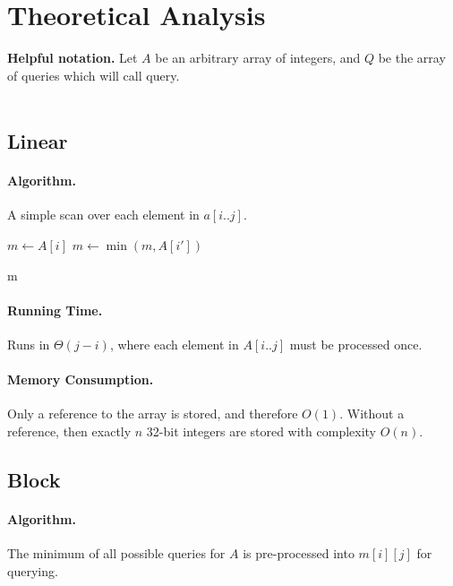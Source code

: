 \documentclass{article}
\theoremstyle{definition}
\begin{document}
\section{Theoretical Analysis}
\textbf{Helpful notation.} Let $A$ be an arbitrary array of integers, and $Q$ be the array of queries which will call query.
\\
\\

\subsection{Linear}
\paragraph{Algorithm.}
A simple scan over each element in $a[i..j]$.

\begin{algorithm}[H]
\caption{Linear Search}
\label{alg:linear}
\begin{algorithmic}[H]
    \State $\mathit{m} \gets A[i]$
        \State $\mathit{m} \gets \min(m, A[i\prime])$
    \EndFor

    \State \Return m
\EndFunction
\end{algorithmic}
\end{algorithm}

\paragraph{Running Time.}
Runs in $\Theta(j - i)$, where each element in $A[i..j]$ must be processed once.

\paragraph{Memory Consumption.}
Only a reference to the array is stored, and therefore $O(1)$.  Without a reference, then exactly $n$ 32-bit integers are stored with complexity $O(n)$.

\subsection{Block}

\paragraph{Algorithm.}
The minimum of all possible queries for $A$ is pre-processed into $m[i][j]$ for querying.
\end{document}
